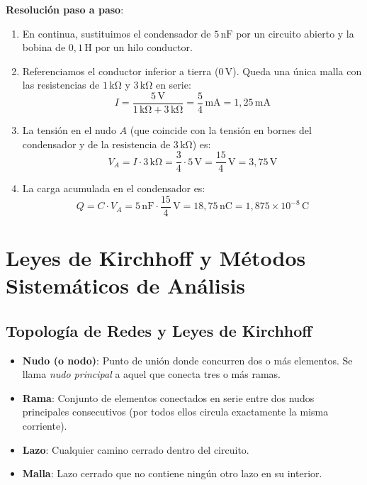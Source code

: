 \begin{ejemplo}
\textbf{Resolución paso a paso}:
\begin{enumerate}
    \item En continua, sustituimos el condensador de $5\,\si{\nano\farad}$ por un circuito abierto y la bobina de $0{,}1\,\si{\henry}$ por un hilo conductor.
    \item Referenciamos el conductor inferior a tierra ($0\,\si{\volt}$). Queda una única malla con las resistencias de $1\,\si{\kilo\ohm}$ y $3\,\si{\kilo\ohm}$ en serie:
    \begin{equation*}
        I = \frac{5\,\si{\volt}}{1\,\si{\kilo\ohm} + 3\,\si{\kilo\ohm}} = \frac{5}{4}\,\si{\milli\ampere} = 1{,}25\,\si{\milli\ampere}
    \end{equation*}
    \item La tensión en el nudo $A$ (que coincide con la tensión en bornes del condensador y de la resistencia de $3\,\si{\kilo\ohm}$) es:
    \begin{equation*}
        V_A = I \cdot 3\,\si{\kilo\ohm} = \frac{3}{4}\cdot 5\,\si{\volt} = \frac{15}{4}\,\si{\volt} = 3{,}75\,\si{\volt}
    \end{equation*}
    \item La carga acumulada en el condensador es:
    \begin{equation*}
        Q = C \cdot V_A = 5\,\si{\nano\farad} \cdot \frac{15}{4}\,\si{\volt} = 18{,}75\,\si{\nano\coulomb} = 1{,}875\times 10^{-8}\,\si{\coulomb}
    \end{equation*}
\end{enumerate}
\end{ejemplo}

\section{Leyes de Kirchhoff y Métodos Sistemáticos de Análisis}

\subsection{Topología de Redes y Leyes de Kirchhoff}
\begin{itemize}
    \item \textbf{Nudo (o nodo)}: Punto de unión donde concurren dos o más elementos. Se llama \emph{nudo principal} a aquel que conecta tres o más ramas.
    \item \textbf{Rama}: Conjunto de elementos conectados en serie entre dos nudos principales consecutivos (por todos ellos circula exactamente la misma corriente).
    \item \textbf{Lazo}: Cualquier camino cerrado dentro del circuito.
    \item \textbf{Malla}: Lazo cerrado que no contiene ningún otro lazo en su interior.
\end{itemize}

